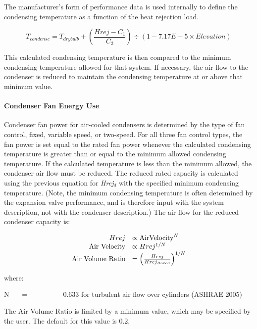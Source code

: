 The manufacturer's form of performance data is used internally to define the condensing temperature as a function of the heat rejection load.

\begin{equation}
{T_{condense}} = {T_{drybulb}} + \left( {\frac{{Hrej - {C_1}}}{{{C_2}}}} \right) \div (1 - 7.17E - 5 \times Elevation)
\end{equation}

This calculated condensing temperature is then compared to the minimum condensing temperature allowed for that system. If necessary, the air flow to the condenser is reduced to maintain the condensing temperature at or above that minimum value.

\paragraph{Condenser Fan Energy Use}\label{condenser-fan-energy-use-1}

Condenser fan power for air-cooled condensers is determined by the type of fan control, fixed, variable speed, or two-speed. For all three fan control types, the fan power is set equal to the rated fan power whenever the calculated condensing temperature is greater than or equal to the minimum allowed condensing temperature. If the calculated temperature is less than the minimum allowed, the condenser air flow must be reduced. The reduced rated capacity is calculated using the previous equation for \emph{Hrej\(_{d}\)} with the specified minimum condensing temperature. (Note, the minimum condensing temperature is often determined by the expansion valve performance, and is therefore input with the system description, not with the condenser description.) The air flow for the reduced condenser capacity is:

\begin{equation}
  \begin{array}{rl}
    Hrej &\propto \text{AirVelocity}^N \\
    \text{Air Velocity} &\propto Hrej^{1/N} \\
    \text{Air Volume Ratio} &= \PB{\frac{Hrej}{Hrej_{Rated}}}^{1/N}
  \end{array}
\end{equation}

where:

N~~~ = ~~~~~~~~~ 0.633 for turbulent air flow over cylinders (ASHRAE 2005)

The Air Volume Ratio is limited by a minimum value, which may be specified by the user. The default for this value is 0.2,

